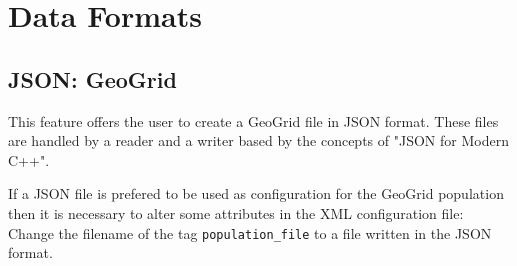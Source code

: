
\section{Data Formats}
\label{section:DataFormats}

\subsection{JSON: GeoGrid}
This feature offers the user to create a GeoGrid file in JSON format. These files are handled by a reader and a writer based by the concepts of "JSON for Modern C++".

If a JSON file is prefered to be used as configuration for the GeoGrid population then it is necessary to alter some attributes in the XML configuration file:\\
Change the filename of the tag \texttt{population\_file} to a file written in the JSON format.

